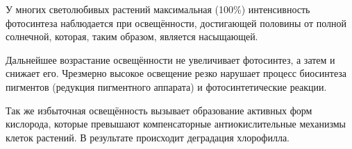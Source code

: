 У многих светолюбивых растений максимальная (100\%) интенсивность фотосинтеза наблюдается при освещённости, достигающей половины от полной солнечной, которая, таким образом, является насыщающей. 

Дальнейшее возрастание освещённости не увеличивает фотосинтез, а затем и снижает его. Чрезмерно высокое освещение резко нарушает процесс биосинтеза пигментов (редукция пигментного аппарата) и фотосинтетические реакции. 

Так же избыточная освещённость вызывает образование активных форм кислорода, которые превышают компенсаторные антиокислительные механизмы клеток растений. В результате происходит деградация хлорофилла. 

